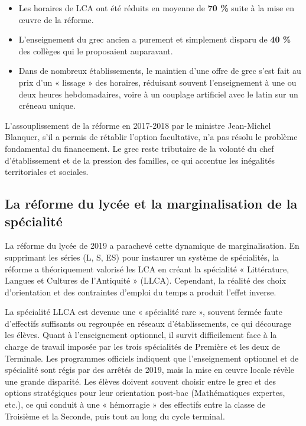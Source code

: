 \begin{itemize}\item Les horaires de LCA ont été réduits en moyenne de \textbf{70 \%} suite à la mise en œuvre de la réforme.\cite{I-3-3-ref3}\item L'enseignement du grec ancien a purement et simplement disparu de \textbf{40 \%} des collèges qui le proposaient auparavant.\cite{I-3-3-ref3}\item Dans de nombreux établissements, le maintien d'une offre de grec s'est fait au prix d'un « lissage » des horaires, réduisant souvent l'enseignement à une ou deux heures hebdomadaires, voire à un couplage artificiel avec le latin sur un créneau unique.\cite{I-3-3-ref2}\end{itemize}L'assouplissement de la réforme en 2017-2018 par le ministre Jean-Michel Blanquer, s'il a permis de
rétablir l'option facultative, n'a pas résolu le problème fondamental du financement. Le grec reste
tributaire de la volonté du chef d'établissement et de la pression des familles, ce qui accentue les
inégalités territoriales et sociales.\cite{I-3-3-ref2}



\subsection{La réforme du lycée et la marginalisation de la spécialité}

La réforme du lycée de 2019 a parachevé cette dynamique de marginalisation. En supprimant les séries
(L, S, ES) pour instaurer un système de spécialités, la réforme a théoriquement valorisé les LCA en
créant la spécialité « Littérature, Langues et Cultures de l'Antiquité » (LLCA). Cependant, la
réalité des choix d'orientation et des contraintes d'emploi du temps a produit l'effet inverse.

La spécialité LLCA est devenue une « spécialité rare », souvent fermée faute d'effectifs suffisants
ou regroupée en réseaux d'établissements, ce qui décourage les élèves. Quant à l'enseignement
optionnel, il survit difficilement face à la charge de travail imposée par les trois spécialités de
Première et les deux de Terminale. Les programmes officiels indiquent que l'enseignement optionnel
et de spécialité sont régis par des arrêtés de 2019, mais la mise en œuvre locale révèle une grande
disparité.\cite{I-3-3-ref6} Les élèves doivent souvent choisir entre le grec et des options
stratégiques pour leur orientation post-bac (Mathématiques expertes, etc.), ce qui conduit à une «
hémorragie » des effectifs entre la classe de Troisième et la Seconde, puis tout au long du cycle
terminal.\cite{I-3-3-ref1}


